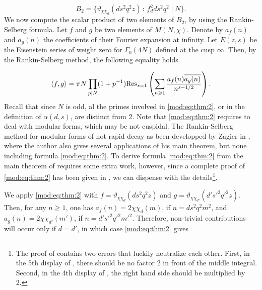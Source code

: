 \documentclass[leqno,10pt]{amsart}
\theoremstyle{plain}
\numberwithin{equation}{section}
\theoremstyle{definition}
\theoremstyle{remark}
\begin{document}
\begin{equation*}
B_2=\{ \vartheta_{\chi\chi_d}(ds^2q^2 z)\,:\, f_d^2 ds^2q^2 \mid N\}.
\end{equation*}
We now compute the scalar product of two elements of $B_2$, by using the Rankin-Selberg formula. Let $f$ and $g$ be two elements of $M(N,\chi)$. Denote by $a_f(n)$ and $a_g(n)$ the coefficients of their Fourier expansion at infinity. Let $E(z,s)$ be the Eisenstein series of weight zero for $\Gamma_0(4N)$ defined at the cusp $\infty$. Then, by the Rankin-Selberg method, the following equality holds.

\begin{equation}\label{mod:eq:thm:2}
\langle f,g\rangle = 
\pi N \prod_{p\vert N}(1+p^{-1}) \textnormal{Res}_{s=1} \left( \sum_{n\geqslant 1} \frac{a_f(n) \overline{a_g(n)}}{n^{s-1/2}}\right).
\end{equation}
Recall that since $N$ is odd, al the primes involved in \eqref{mod:eq:thm:2}, or in the definition of $\alpha(d,s)$, are distinct from 2.
Note that \eqref{mod:eq:thm:2} requires to deal with modular forms, which may be not cuspidal. The Rankin-Selberg method for modular forms of not rapid decay as been developped by Zagier in \cite{zag:rs}, where the author also gives several applications of his main theorem, but none including formula \eqref{mod:eq:thm:2}. To derive formula \eqref{mod:eq:thm:2} from the main theorem of \cite{zag:rs} requires some extra work, however, since a complete proof of \eqref{mod:eq:thm:2} has been given in \cite[Theorem\,2.2]{chi:non-decay}, we can dispense with the details\footnote{The proof of \cite[Theorem\,2.2]{chi:non-decay} contains two errors that luckily neutralize each other. First, in the 5th display of \cite[p.16]{chi:non-decay}, there should be no factor 2 in front of the middle integral. Second, in the 4th display of \cite[p.17]{chi:non-decay}, the right hand side should be multiplied by 2.}.

We apply \eqref{mod:eq:thm:2} with $f=\vartheta_{\chi\chi_d}(ds^2q^2 z)$ 
and $g= \vartheta_{\chi\chi_{d'}}(d's'^2q'^2 z)$. Then, for any $n\geqslant 1$, one has $a_f(n)= 2 \chi\chi_d(m)$, if $n=ds^2q^2m^2$, and $a_g(n)= 2 \chi\chi_{d'}(m')$, if $n=d's'^2q'^2m'^2$. Therefore, non-trivial contributions will occur only if $d=d'$, in which case \eqref{mod:eq:thm:2} gives
\end{document}
